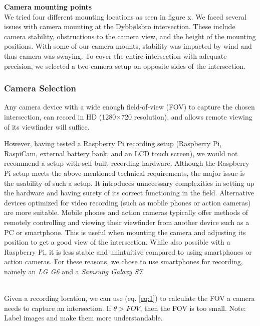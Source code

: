 \textbf{Camera mounting points} \\
We tried four different mounting locations as seen in figure x. 
We faced several issues with camera mounting at the Dybbølsbro intersection.
These include camera stability, obstructions to the camera view, and the height of the mounting positions. 
With some of our camera mounts, stability was impacted by wind and thus camera was swaying. 
To cover the entire intersection with adequate precision, we selected a two-camera setup on opposite 
sides of the intersection.


\subsubsection{Camera Selection}
Any camera device with a wide enough field-of-view (FOV) to capture the chosen intersection, 
can record in HD (1280×720 resolution), and allows remote viewing of its viewfinder will suffice. 

However, having tested a Raspberry Pi recording setup (Raspberry Pi, RaspiCam, external battery bank, 
and an LCD touch screen), we would not recommend a setup with self-built recording hardware.
Although the Raspberry Pi setup meets the above-mentioned technical requirements, the major issue is 
the usability of such a setup. 
It introduces unnecessary complexities in setting up the hardware and having surety of its correct functioning in the field.
Alternative devices optimized for video recording (such as mobile phones or action cameras) are more suitable.
Mobile phones and action cameras typically offer methods of remotely controlling and viewing their viewfinder from 
another device such as a PC or smartphone. 
This is useful when mounting the camera and adjusting its position to get a good view of the intersection. 
While also possible with a Raspberry Pi, it is less stable and unintuitive compared to using smartphones or action cameras.
For these reasons, we chose to use smartphones for recording, namely an \textit{LG G6} and a \textit{Samsung Galaxy S7}.

\ \\

Given a recording location, we can use (eq. \ref{eq:1}) to calculate the FOV a camera needs to capture an intersection.
If $\theta > FOV$, then the FOV is too small.
\color{red}
Note: Label images and make them more understandable.
\color{black}

